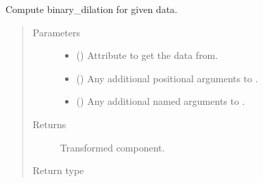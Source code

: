 \documentclass[letterpaper,10pt,english]{sphinxmanual}
\begin{document}
\begin{fulllineitems}
\begin{fulllineitems}
\begin{quote}
\begin{description}
\end{description}\end{quote}

\end{fulllineitems}


\begin{fulllineitems}
\label{\detokenize{api/base_classes:geology.src.base_spatial.SpatialComponent.binary_dilation}}
Compute binary\_dilation for given data.
\begin{quote}\begin{description}
\item[{Parameters}] \leavevmode\begin{itemize}
\item {} 
 (\sphinxstyleliteralemphasis{\sphinxupquote{, }}) \textendash{} Attribute to get the data from.

\item {} 
 () \textendash{} Any additional positional arguments to .

\item {} 
 () \textendash{} Any additional named arguments to .

\end{itemize}

\item[{Returns}] \leavevmode
{} \textendash{} Transformed component.

\item[{Return type}] \leavevmode
{\hyperref[\detokenize{api/base_classes:geology.src.base_spatial.SpatialComponent}]{}}

\end{description}\end{quote}


\end{fulllineitems}
\end{fulllineitems}
\end{document}
